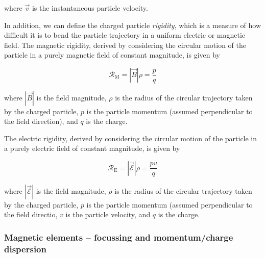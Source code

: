 where $\vec{v}$ is the instantaneous particle velocity. 

In addition, we can define the charged particle {\em rigidity}, which is a measure of how difficult it is to bend the particle trajectory in a uniform electric or magnetic field. The magnetic rigidity, derived by considering the circular motion of the particle in a purely magnetic field of constant magnitude, is given by

\begin{equation}
\label{magrigidity}
\mathcal{R}_\mathrm{M}=|\vec{B}|\rho=\frac{p}{q}
\end{equation}

where $|\vec{B}|$ is the field magnitude, $\rho$ is the radius of the circular trajectory taken by the charged particle, $p$ is the particle momentum (assumed perpendicular to the field direction), and $q$ is the charge.

The electric rigidity, derived by considering the circular motion of the particle in a purely electric field of constant magnitude, is given by

\begin{equation}
\mathcal{R}_\mathrm{E}=|\vec{\mathcal{E}}|\rho=\frac{pv}{q}
\end{equation}

where $|\vec{\mathcal{E}}|$ is the field magnitude, $\rho$ is the radius of the circular trajectory taken by the charged particle, $p$ is the particle momentum (assumed perpendicular to the field directio, $v$ is the particle velocity, and $q$ is the charge.


\subsubsection{Magnetic elements -- focussing and momentum/charge dispersion}\label{magel}


